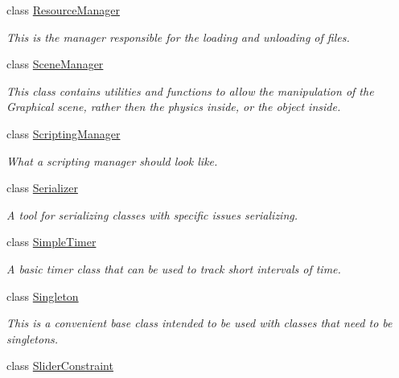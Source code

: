 \begin{DoxyCompactItemize}
class \hyperlink{classMezzanine_1_1ResourceManager}{ResourceManager}
\begin{DoxyCompactList}\small\item\em This is the manager responsible for the loading and unloading of files. \item\end{DoxyCompactList}\item 
class \hyperlink{classMezzanine_1_1SceneManager}{SceneManager}
\begin{DoxyCompactList}\small\item\em This class contains utilities and functions to allow the manipulation of the Graphical scene, rather then the physics inside, or the object inside. \item\end{DoxyCompactList}\item 
class \hyperlink{classMezzanine_1_1ScriptingManager}{ScriptingManager}
\begin{DoxyCompactList}\small\item\em What a scripting manager should look like. \item\end{DoxyCompactList}\item 
class \hyperlink{classMezzanine_1_1Serializer}{Serializer}
\begin{DoxyCompactList}\small\item\em A tool for serializing classes with specific issues serializing. \item\end{DoxyCompactList}\item 
class \hyperlink{classMezzanine_1_1SimpleTimer}{SimpleTimer}
\begin{DoxyCompactList}\small\item\em A basic timer class that can be used to track short intervals of time. \item\end{DoxyCompactList}\item 
class \hyperlink{classMezzanine_1_1Singleton}{Singleton}
\begin{DoxyCompactList}\small\item\em This is a convenient base class intended to be used with classes that need to be singletons. \item\end{DoxyCompactList}\item 
class \hyperlink{classMezzanine_1_1SliderConstraint}{SliderConstraint}
\item 

\end{DoxyCompactItemize}
